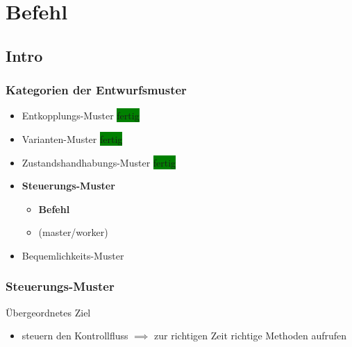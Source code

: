 \documentclass[18pt]{beamer}
\begin{document}
\section{Befehl}
	\subsection{Intro}
	\begin{frame}
		\frametitle{Kategorien der Entwurfsmuster}
		\begin{itemize}
			\item Entkopplungs-Muster \colorbox{green}{fertig}
			\item Varianten-Muster \colorbox{green}{fertig}
			\item Zustandshandhabungs-Muster \colorbox{green}{fertig}
			\item \textbf{Steuerungs-Muster} 
				\begin{itemize}
					\item \textbf{Befehl}
					\item (master/worker)
				\end{itemize}
			\item Bequemlichkeits-Muster
		\end{itemize}
	\end{frame}
	
	\begin{frame}
		\frametitle{Steuerungs-Muster}
		\begin{block}{Übergeordnetes Ziel}
			\begin{itemize}
				\item steuern den Kontrollfluss \pause 
				\linebreak $\implies$ zur richtigen Zeit richtige Methoden aufrufen
			\end{itemize}
		\end{block}
	\end{frame}
\end{document}
